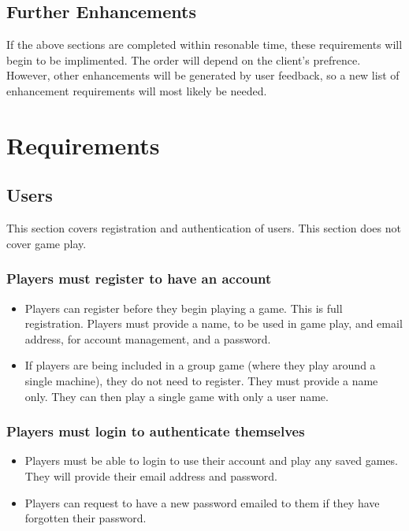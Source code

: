 \subsection{Further Enhancements}
\pD If the above sections are completed within resonable time, these requirements will begin to be implimented. The order will depend on the client's prefrence. However, other enhancements will be generated by user feedback, so a new list of enhancement requirements will most likely be needed.


\section{Requirements}

\subsection{Users}
This section covers registration and authentication of users. This section does not cover game play.
	\subsubsection{Players must register to have an account}
	  \begin{itemize}
	  	\item \pA Players can register before they begin playing a game. This is full registration. Players must provide a name, to be used in game play, and email address, for account management, and a password.
	  	\item \pC If players are being included in a group game (where they play around a single machine), they do not need to register. They must provide a name only. They can then play a single game with only a user name.
	  \end{itemize}
	\subsubsection{Players must login to authenticate themselves}
	  \begin{itemize}
	  	\item \pA Players must be able to login to use their account and play any saved games. They will provide their email address and password.
	  	\item \pB Players can request to have a new password emailed to them if they have forgotten their password.
	  \end{itemize}
